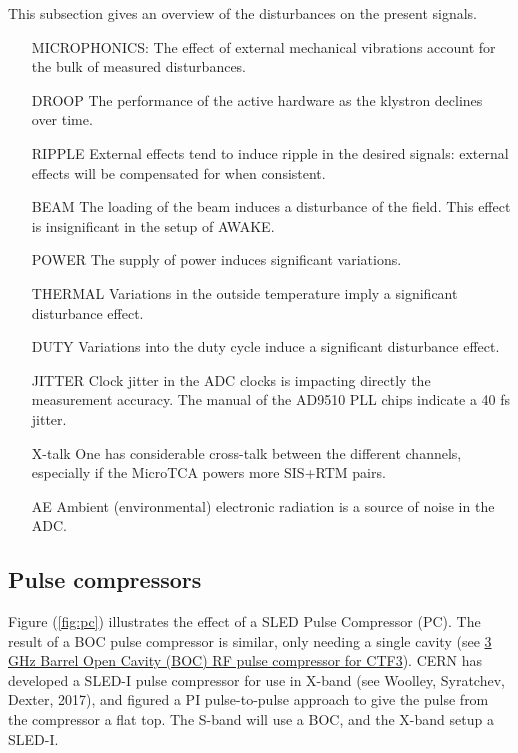 \documentclass[12pt]{amsart}
\begin{document}
This subsection gives an overview of the disturbances on the present signals.
\begin{itemize}
\item[MICROPHONICS:] The effect of external mechanical vibrations account for the bulk of measured disturbances.
\item[DROOP] The performance of the active hardware as the klystron declines over time.
\item[RIPPLE] External effects tend to induce ripple in the desired signals:
	external effects will be compensated for when consistent.   
\item[BEAM] The loading of the beam induces a disturbance of the field. This effect is insignificant in the setup of AWAKE.
\item[POWER] The supply of power induces significant variations.
\item[THERMAL] Variations in the outside temperature imply a significant disturbance effect. 
\item[DUTY] Variations into the duty cycle induce a significant disturbance effect.  
\item[JITTER ] Clock jitter in the ADC clocks is impacting directly the measurement accuracy.
	The manual of the AD9510 PLL chips indicate a 40 fs jitter.
\item[X-talk] One has considerable cross-talk between the different channels, especially if the MicroTCA powers more SIS+RTM pairs.
\item[AE] Ambient (environmental) electronic radiation is a source of noise in the ADC. 
\end{itemize} 


\subsection{Pulse compressors}

Figure (\ref{fig:pc}) illustrates the effect of a SLED Pulse Compressor (PC).
The result of a BOC pulse compressor is similar, only needing a single cavity 
(see \url{3 GHz Barrel Open Cavity (BOC) RF pulse compressor for CTF3}).
CERN has developed a SLED-I pulse compressor for use in X-band (see Woolley, Syratchev, Dexter, 2017), and figured a PI
pulse-to-pulse approach to give the pulse from the compressor a flat top.
The S-band will use a BOC, and the X-band setup a SLED-I.
\end{document}
